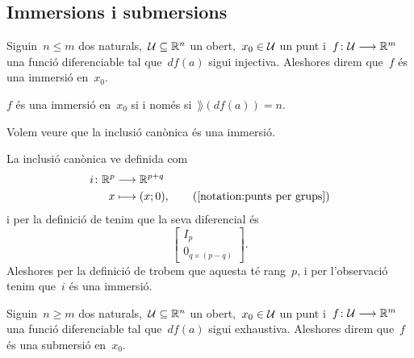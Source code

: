 \documentclass[../../main.tex]{subfiles}
\begin{document}
    \subsection{Immersions i submersions}
    \begin{definition}[Immersió]
        \label{def:immersió}
        Siguin~\(n\leq m\) dos naturals,~\(\mathcal{U}\subseteq\mathbb{R}^{n}\) un obert,~\(x_{0}\in\mathcal{U}\) un punt i~\(f\colon\mathcal{U}\longrightarrow\mathbb{R}^{m}\) una funció diferenciable tal que~\(df(a)\) sigui injectiva.
        Aleshores direm que~\(f\) és una immersió en~\(x_{0}\).
    \end{definition}
    \begin{observation} %
        \label{obs:immersió si i només si té rang maximal}
        \(f\) és una immersió en~\(x_{0}\) si i només si~\(\rang(df(a))=n\).
    \end{observation}
    \begin{example}
        \label{ex:la inclusió canònica és una immersió}
        Volem veure que la inclusió canònica és una immersió.
    \end{example}
    \begin{solution}
        La inclusió canònica ve definida com
        \begin{align*}
            i\colon\mathbb{R}^{p}&\longrightarrow\mathbb{R}^{p+q} \\
            x&\longmapsto(x;0), \tag{\ref{notation:punts per grups}}
        \end{align*}
        i per la definició de  tenim que la seva diferencial és
        \[\left[\begin{array}{c}
            I_{p} \\\hline
            0_{q\times(p-q)}
        \end{array}\right].\]
        Aleshores per la definició de  trobem que aquesta té rang~\(p\), i per l'observació  tenim que~\(i\) és una immersió.
    \end{solution}
    \begin{definition}[Submersió]
        \label{def:submersió}
        Siguin~\(n\geq m\) dos naturals,~\(\mathcal{U}\subseteq\mathbb{R}^{n}\) un obert,~\(x_{0}\in\mathcal{U}\) un punt i~\(f\colon\mathcal{U}\longrightarrow\mathbb{R}^{m}\) una funció diferenciable tal que~\(df(a)\) sigui exhaustiva.
        Aleshores direm que~\(f\) és una submersió en~\(x_{0}\).
    \end{definition}
\end{document}
